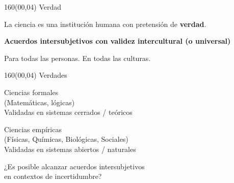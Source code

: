 \documentclass[shownotes,aspectratio=169]{beamer}
\begin{document}
\begin{frame}[plain]
\begin{textblock}{160}(00,04)
\centering
\LARGE Verdad
\end{textblock}
\vspace{2cm} \large

\centering

 La ciencia es una institución humana con pretensión de \textbf{verdad}. \\[0.1cm] \pause

\textbf{Acuerdos intersubjetivos con validez intercultural (o universal)}


\vspace{1cm}
\pause

Para todas las personas. En todas las culturas.

\end{frame}


\begin{frame}[plain]
\begin{textblock}{160}(00,04)
\centering
\LARGE Verdades
\end{textblock}
\vspace{1cm} \large

\centering

 \Large Ciencias formales \\
 \normalsize \textcolor{black!50}{(Matemáticas, lógicas)} \\
 \large  Validadas en sistemas cerrados / teóricos\\

 \vspace{0.7cm}

  \pause

 \Large Ciencias empíricas \\
\normalsize  \textcolor{black!50}{(Físicas, Químicas, Biológicas, Sociales)} \\
\large Validadas en sistemas abiertos / naturales

\pause
\vspace{0.6cm}

¿Es posible alcanzar acuerdos intersubjetivos \\ en contextos de incertidumbre?
%
%
%

\end{frame}
\end{document}
